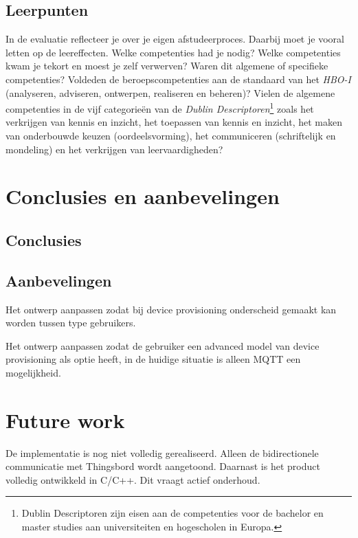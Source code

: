 		\section{Leerpunten}
		In de evaluatie reflecteer je over je eigen afstudeerproces. Daarbij
		moet je vooral letten op de leereffecten. Welke competenties had je
		nodig? Welke competenties kwam je tekort en moest je zelf verwerven?
		Waren dit algemene of specifieke competenties?  Voldeden de
		beroepscompetenties aan de standaard van het \emph{HBO-I} (analyseren,
		adviseren, ontwerpen, realiseren en beheren)?  Vielen de algemene
		competenties in de vijf categorieën van de \emph{Dublin
			Descriptoren}\footnote{Dublin Descriptoren zijn eisen aan de
			competenties voor de bachelor en master studies aan universiteiten en
			hogescholen in Europa.} zoals het verkrijgen van kennis en inzicht,
		het toepassen van kennis en inzicht, het maken van onderbouwde keuzen
		(oordeelsvorming), het communiceren (schriftelijk en mondeling) en het
		verkrijgen van leervaardigheden?	
		
			
		
		\chapter{Conclusies en aanbevelingen}
		\section{Conclusies}
		
		\section{Aanbevelingen}
		Het ontwerp aanpassen zodat bij device provisioning onderscheid gemaakt kan worden tussen type gebruikers.
		
		
		Het ontwerp aanpassen zodat de gebruiker een advanced model van device provisioning als optie heeft, in de huidige situatie is alleen MQTT een mogelijkheid.
		
		\chapter{Future work}
		
		De implementatie is nog niet volledig gerealiseerd.  Alleen de bidirectionele communicatie met Thingsbord wordt aangetoond.
		Daarnast is het product volledig ontwikkeld in C/C++. Dit vraagt actief onderhoud.
		
